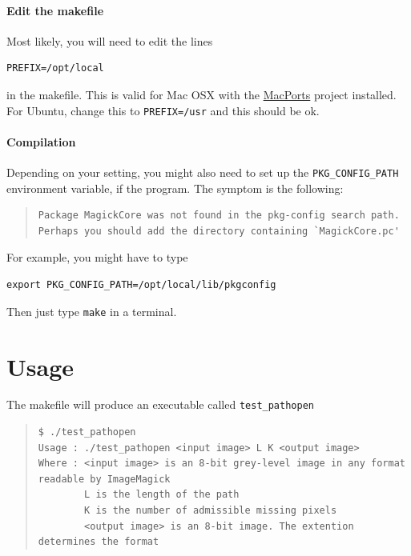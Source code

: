 \documentclass[11pt]{article}
\begin{document}
\paragraph{Edit the makefile}
Most likely, you will need to edit the lines

\begin{verbatim}
PREFIX=/opt/local
\end{verbatim}

in the makefile. This is valid for Mac OSX with the \href{http://www.macports.org/}{MacPorts}
project installed. For Ubuntu, change this to {\tt PREFIX=/usr} and this should
be ok.

\paragraph{Compilation}
Depending on your setting, you might also need to set up the 
{\tt PKG\_CONFIG\_PATH} environment variable, if the program. The symptom is the
following:

\begin{quote}
\begin{verbatim}
Package MagickCore was not found in the pkg-config search path.
Perhaps you should add the directory containing `MagickCore.pc'
\end{verbatim}
\end{quote}

For example, you might have to type

\begin{verbatim}
export PKG_CONFIG_PATH=/opt/local/lib/pkgconfig
\end{verbatim}

Then just type {\tt make} in a terminal.

\section{Usage}
The makefile will produce an executable called {\tt test\_pathopen}

\begin{quote}
\begin{verbatim}
$ ./test_pathopen 
Usage : ./test_pathopen <input image> L K <output image>
Where : <input image> is an 8-bit grey-level image in any format readable by ImageMagick
        L is the length of the path 
        K is the number of admissible missing pixels 
        <output image> is an 8-bit image. The extention determines the format
\end{verbatim}
\end{quote}
\end{document}

